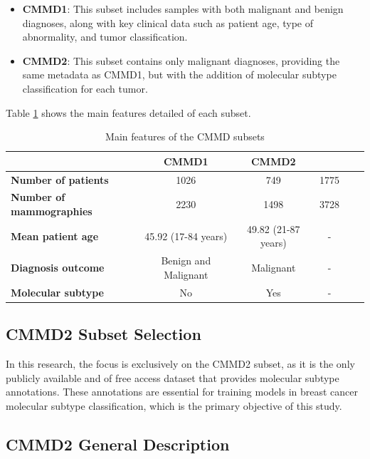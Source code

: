 \documentclass[a4paper,10pt]{book}
\begin{document}
\begin{itemize}
    \item \textbf{CMMD1}: This subset includes samples with both malignant and benign diagnoses, along with key clinical data such as patient age, type of abnormality, and tumor classification.
    \item \textbf{CMMD2}: This subset contains only malignant diagnoses, providing the same metadata as CMMD1, but with the addition of molecular subtype classification for each tumor.
\end{itemize}


Table \ref{tab:cmmd_features} shows the main features detailed of each subset.

\begin{table}
	\caption[CMMD subsets features]{Main features of the CMMD subsets}
	\centering
	\begin{tabular}{lccccc}
		\toprule
		                                 & \textbf{CMMD1}       & \textbf{CMMD2}      &      \\
		\midrule
		\textbf{Number of patients}      & 1026                 & 749                 & 1775 \\
		\textbf{Number of mammographies} & 2230                 & 1498                & 3728 \\
		\textbf{Mean patient age}        & 45.92 (17-84 years)  & 49.82 (21-87 years) & -    \\
		\textbf{Diagnosis outcome}       & Benign and Malignant & Malignant           & -    \\
		\textbf{Molecular subtype}       & No                   & Yes                 & -    \\
		\bottomrule
	\end{tabular}
	\label{tab:cmmd_features}
\end{table}

\subsection{CMMD2 Subset Selection}

In this research, the focus is exclusively on the CMMD2 subset, as it is the only publicly available and of free access dataset that provides molecular subtype annotations. These annotations are essential for training models in breast cancer molecular subtype classification, which is the primary objective of this study.

\subsection{CMMD2 General Description}
\end{document}
